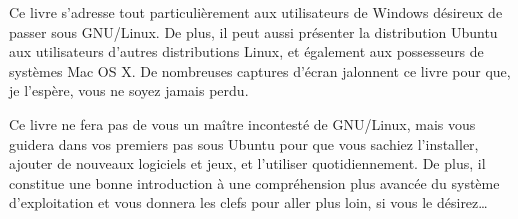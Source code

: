 Ce livre s'adresse tout particulièrement aux utilisateurs de Windows désireux de passer sous GNU/Linux. De plus, il peut aussi présenter la distribution Ubuntu aux utilisateurs d'autres distributions Linux, et également aux possesseurs de systèmes Mac OS X. De nombreuses captures d'écran jalonnent ce livre pour que, je l'espère, vous ne soyez jamais perdu.\par
Ce livre ne fera pas de vous un maître incontesté de GNU/Linux, mais vous guidera dans vos premiers pas sous Ubuntu pour que vous sachiez l'installer, ajouter de nouveaux logiciels et jeux, et l'utiliser quotidiennement. De plus, il constitue une bonne introduction à une compréhension plus avancée du système d'exploitation et vous donnera les clefs pour aller plus loin, si vous le désirez\ldots{}\par
